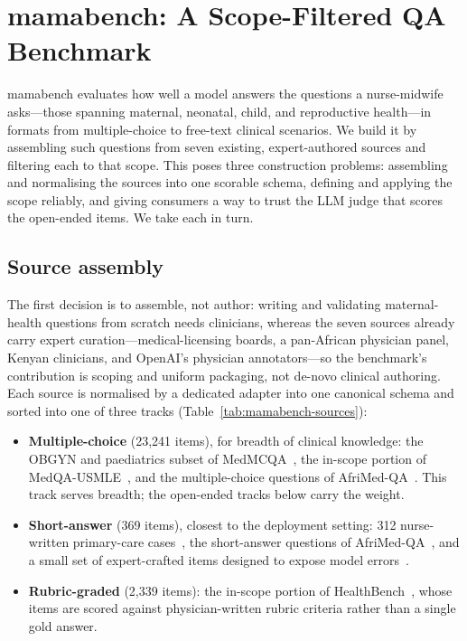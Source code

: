 \section{mamabench: A Scope-Filtered QA Benchmark}
\label{sec:mamabench}

mamabench evaluates how well a model answers the questions a nurse-midwife
asks---those spanning maternal, neonatal, child, and reproductive health---in
formats from multiple-choice to free-text clinical scenarios. We build it by
assembling such questions from seven existing, expert-authored sources and
filtering each to that scope. This poses three construction problems: assembling
and normalising the sources into one scorable schema, defining and applying the
scope reliably, and giving consumers a way to trust the LLM judge that scores the
open-ended items. We take each in turn.

\subsection{Source assembly}

The first decision is to assemble, not author: writing and validating
maternal-health questions from scratch needs clinicians, whereas the seven
sources already carry expert curation---medical-licensing boards, a pan-African
physician panel, Kenyan clinicians, and OpenAI's physician annotators---so the
benchmark's contribution is scoping and uniform packaging, not de-novo clinical
authoring.
Each source is normalised by a dedicated adapter into one canonical schema and
sorted into one of three tracks (Table~\ref{tab:mamabench-sources}):

\begin{itemize}
  \item \textbf{Multiple-choice} (23{,}241 items), for breadth of clinical
  knowledge: the OBGYN and paediatrics subset of MedMCQA~\cite{pal2022medmcqa},
  the in-scope portion of MedQA-USMLE~\cite{jin2021medqa}, and the
  multiple-choice questions of AfriMed-QA~\cite{olatunji2025afrimedqa}. This
  track serves breadth; the open-ended tracks below carry the weight.
  \item \textbf{Short-answer} (369 items), closest to the deployment setting:
  312 nurse-written primary-care cases~\cite{kenya2025vignettes}, the
  short-answer questions of AfriMed-QA~\cite{olatunji2025afrimedqa}, and a small
  set of expert-crafted items designed to expose model
  errors~\cite{whb2025}.
  \item \textbf{Rubric-graded} (2{,}339 items): the in-scope portion of
  HealthBench~\cite{arora2025healthbench}, whose items are scored against
  physician-written rubric criteria rather than a single gold answer.
\end{itemize}

